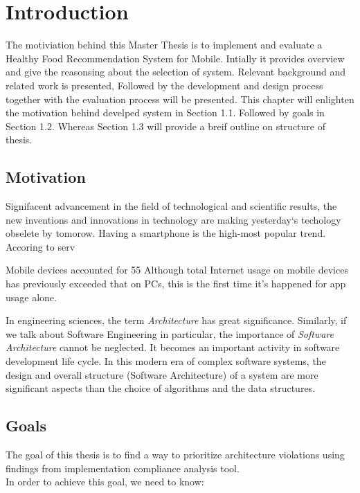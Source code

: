\chapter{Introduction}
\setcounter{page}{1}%
\thispagestyle{empty}

The motiviation behind this Master Thesis is to implement and evaluate a Healthy Food Recommendation System for Mobile. Intially it provides overview and give the reasonsing about the selection of system. Relevant background and related work is presented, Followed by the development and design process together with the evaluation process will be presented. \newline
This chapter will enlighten the motivation behind develped system in Section 1.1. Followed by goals in Section 1.2. Whereas Section 1.3 will provide a breif outline on structure of thesis.

\section{Motivation}\label{motivation}

Signifacent advancement in the field of  technological and scientific results, the new inventions and innovations in technology are making yesterday`s techology obselete by tomorow. Having a smartphone is the high-most popular trend. Accoring to serv


Mobile devices accounted for 55%
Although total Internet usage on mobile devices has previously exceeded that on PCs, this is the first time it's happened for app usage alone.

In engineering sciences, the term \textit{Architecture} has great significance. Similarly, if we talk about Software Engineering in particular, the importance of \textit{Software Architecture} cannot be neglected. It becomes an important activity in software development life cycle. In this modern era of complex software systems, the design and overall structure (Software Architecture) of a system are more significant aspects than the choice of algorithms and the data structures.\newline

\section{Goals}
The goal of this thesis is to find a way to prioritize architecture violations using findings from implementation compliance analysis tool. \\In order to achieve this goal, we need to know:


